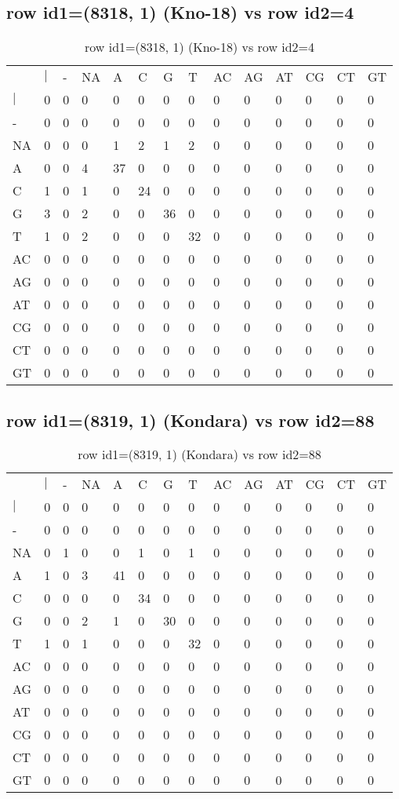 \subsection{row id1=(8318, 1) (Kno-18) vs row id2=4}
\begin{center}
\begin{longtable}{|l|l|l|l|l|l|l|l|l|l|l|l|l|l|}
\caption{row id1=(8318, 1) (Kno-18) vs row id2=4} \label{table_dm504}\\
\hline
\\
\hline
&$|$&-&NA&A&C&G&T&AC&AG&AT&CG&CT&GT\\
$|$&0&0&0&0&0&0&0&0&0&0&0&0&0\\
-&0&0&0&0&0&0&0&0&0&0&0&0&0\\
NA&0&0&0&1&2&1&2&0&0&0&0&0&0\\
A&0&0&4&37&0&0&0&0&0&0&0&0&0\\
C&1&0&1&0&24&0&0&0&0&0&0&0&0\\
G&3&0&2&0&0&36&0&0&0&0&0&0&0\\
T&1&0&2&0&0&0&32&0&0&0&0&0&0\\
AC&0&0&0&0&0&0&0&0&0&0&0&0&0\\
AG&0&0&0&0&0&0&0&0&0&0&0&0&0\\
AT&0&0&0&0&0&0&0&0&0&0&0&0&0\\
CG&0&0&0&0&0&0&0&0&0&0&0&0&0\\
CT&0&0&0&0&0&0&0&0&0&0&0&0&0\\
GT&0&0&0&0&0&0&0&0&0&0&0&0&0\\
\hline
\end{longtable}
\end{center}

\subsection{row id1=(8319, 1) (Kondara) vs row id2=88}
\begin{center}
\begin{longtable}{|l|l|l|l|l|l|l|l|l|l|l|l|l|l|}
\caption{row id1=(8319, 1) (Kondara) vs row id2=88} \label{table_dm506}\\
\hline
\\
\hline
&$|$&-&NA&A&C&G&T&AC&AG&AT&CG&CT&GT\\
$|$&0&0&0&0&0&0&0&0&0&0&0&0&0\\
-&0&0&0&0&0&0&0&0&0&0&0&0&0\\
NA&0&1&0&0&1&0&1&0&0&0&0&0&0\\
A&1&0&3&41&0&0&0&0&0&0&0&0&0\\
C&0&0&0&0&34&0&0&0&0&0&0&0&0\\
G&0&0&2&1&0&30&0&0&0&0&0&0&0\\
T&1&0&1&0&0&0&32&0&0&0&0&0&0\\
AC&0&0&0&0&0&0&0&0&0&0&0&0&0\\
AG&0&0&0&0&0&0&0&0&0&0&0&0&0\\
AT&0&0&0&0&0&0&0&0&0&0&0&0&0\\
CG&0&0&0&0&0&0&0&0&0&0&0&0&0\\
CT&0&0&0&0&0&0&0&0&0&0&0&0&0\\
GT&0&0&0&0&0&0&0&0&0&0&0&0&0\\
\hline
\end{longtable}
\end{center}

